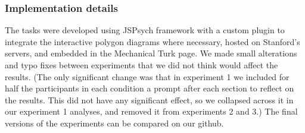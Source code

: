 \documentclass[man,10pt]{apa6}
\begin{document}
\subsubsection{Implementation details}
The tasks were developed using JSPsych framework with a custom plugin to integrate the interactive polygon diagrams where necessary, hosted on Stanford's servers, and embedded in the Mechanical Turk page. We made small alterations and typo fixes between experiments that we did not think would affect the results. (The only significant change was that in experiment 1 we included for half the participants in each condition a prompt after each section to reflect on the results. This did not have any significant effect, so we collapsed across it in our experiment 1 analyses, and removed it from experiments 2 and 3.) The final versions of the experiments can be compared on our github.%
\end{document}
